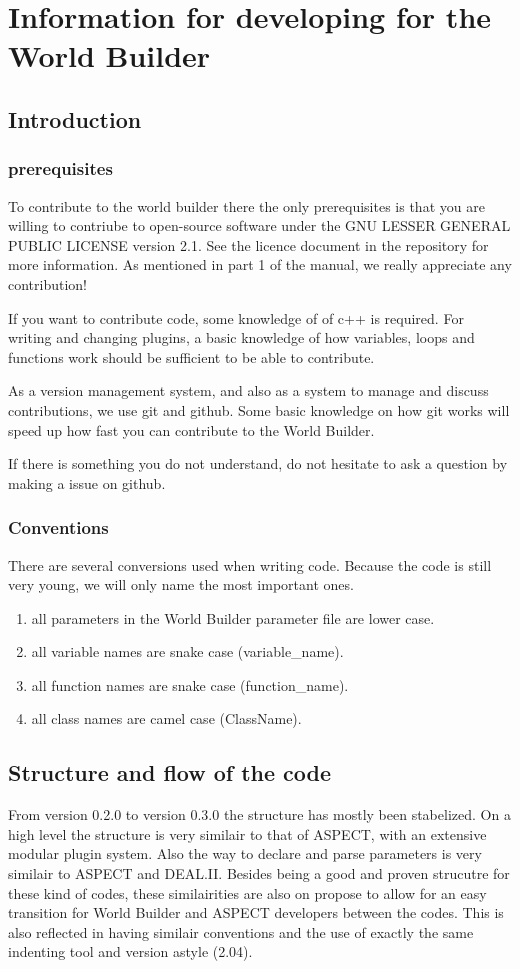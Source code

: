 \documentclass{book}
\newcommand{\WB}{{World Builder}}
\newcommand{\aspect}{{ASPECT}}
\begin{document}
\part{Information for developing for the World Builder}
\chapter{Introduction}
\section{prerequisites}
To contribute to the world builder there the only prerequisites is that you are willing to contriube to open-source software under the GNU LESSER GENERAL PUBLIC LICENSE version 2.1. See the licence document in the repository for more information. As mentioned in part 1 of the manual, we really appreciate any contribution!

If you want to contribute code, some knowledge of of c++ is required. For writing and changing plugins, a basic knowledge of how variables, loops and functions work should be sufficient to be able to contribute. 

As a version management system, and also as a system to manage and discuss contributions, we use git and github. Some basic knowledge on how git works will speed up how fast you can contribute to the \WB{}.

If there is something you do not understand, do not hesitate to ask a question by making a issue on github.

\section{Conventions}
There are several conversions used when writing code. Because the code is still very young, we will only name the most important ones. 
\begin{enumerate}
    \item all parameters in the \WB{} parameter file are lower case.
    \item all variable names are snake case (variable\_name).
    \item all function names are snake case (function\_name).
    \item all class names are camel case (ClassName).
\end{enumerate}
\chapter{Structure and flow of the code}
From version 0.2.0 to version 0.3.0 the structure has mostly been stabelized. On a high level the structure is very similair to that of \aspect{}, 
with an extensive modular plugin system. Also the way to declare and parse parameters is very similair to \aspect{} and DEAL.II. Besides being a 
good and proven strucutre for these kind of codes, these similairities are also on propose to allow for an easy transition for \WB{} and \aspect{}
developers between the codes. This is also reflected in having similair conventions and the use of exactly the same indenting tool and version 
astyle (2.04). 
\end{document}

